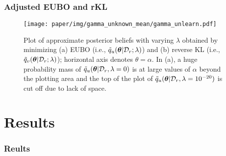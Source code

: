 \documentclass[pdf]{beamer}
\begin{document}
\begin{frame}
  \frametitle{Adjusted EUBO and rKL}
  \begin{figure}
    \centering
    \texttt{[image: paper/img/gamma\_unknown\_mean/gamma\_unlearn.pdf]}
    \caption{Plot of approximate posterior beliefs with varying $\lambda$ obtained by minimizing (a) EUBO (i.e., $\tilde{q}_u(\bm{\theta}|\mathcal{D}_r;\lambda)$) and (b) reverse KL (i.e., $\tilde{q}_v(\bm{\theta}|\mathcal{D}_r;\lambda)$); horizontal axis denotes $\theta = \alpha$.
    In (a), a huge probability
    mass of $\tilde{q}_u(\bm{\theta}|\mathcal{D}_r, \lambda=0)$ is at large values of $\alpha$ beyond the plotting area and the top of the plot of $\tilde{q}_u(\bm{\theta}|\mathcal{D}_r, \lambda=10^{-20})$ is cut off due to lack of space.
    }
    \label{fig:expunlearn}
    \end{figure}
\end{frame}

\section{Results}
\begin{frame}
  \frametitle{Reults}

  
\end{frame}
\end{document}
